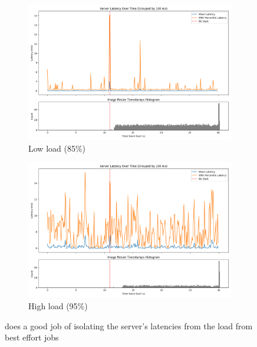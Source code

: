 \begin{figure}[t]
    \centering
    \begin{subfigure}{\columnwidth}
        \includegraphics[width=\columnwidth]{graphs/srv-bg-schedbe-low.png}
        \caption{Low load (85\%)}\label{fig:srv-bg-schedbe-low}
        \vspace{12pt}
    \end{subfigure}
    \begin{subfigure}{\columnwidth}
        \includegraphics[width=\columnwidth]{graphs/srv-bg-schedbe-high.png}
        \caption{High load (95\%)}\label{fig:srv-bg-schedbe-high}
    \end{subfigure}
    \vspace{4pt}
    \caption{ \schedbe{} does a good job of isolating the server's latencies
     from the load from best effort jobs}\label{fig:srv-bg-schedbe}
\end{figure}

